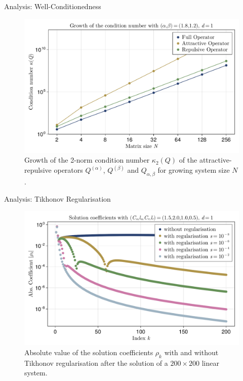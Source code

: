\documentclass[aspectratio=169, hyperref={colorlinks=true}]{beamer}
\begin{document}
  \begin{frame}{Analysis: Well-Conditionedness}
    \begin{figure}[H]
      \centering
      \includegraphics[width=0.65\linewidth]{results/attrep/condition-number-growth.pdf}
      \caption[Growth of the condition number]{Growth of the 2-norm condition number $\kappa_2(Q)$ of the attractive-repulsive operators $Q^{(\alpha)}$, $Q^{(\beta)}$ and $Q_{\alpha,\beta}$ for growing system size $N$.}
      \label{fig:condition-number-growth}
    \end{figure}
  \end{frame}

  \begin{frame}{Analysis: Tikhonov Regularisation}
    \begin{figure}[H]
      \centering
      \includegraphics[width=0.65\linewidth]{results/morse/coefficients.pdf}
      \caption[Absolute value of the coefficients with and without regularisation]{Absolute value of the solution coefficients $\rho_k$ with and without Tikhonov regularisation after the solution of a $200 \times 200$ linear system.}
      \label{fig:coefficients}
    \end{figure}
  \end{frame}
\end{document}
